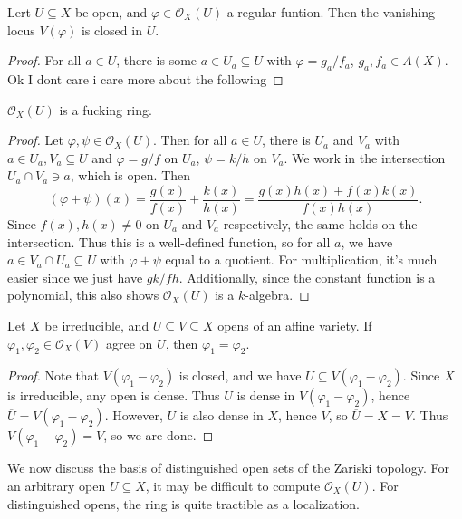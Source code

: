 \begin{lemma}\label{lma:regular-func-zero-loci}
	Lert $U\subseteq X$ be open, and $\varphi \in \mathcal{O}_{X}(U)$ a regular funtion. Then the vanishing locus $V(\varphi )$ is closed in $U$.
\end{lemma}
\begin{proof}
	For all $a\in U$, there is some $a\in U_a \subseteq U$ with $\varphi =g_a/f_a$, $g_a,f_a\in A(X)$. Ok I dont care i care more about the following
\end{proof}
\begin{claim}
	$\mathcal{O}_{X} (U)$ is a fucking ring.
\end{claim}
\begin{proof}
	Let $\varphi ,\psi \in \mathcal{O}_{X} (U)$. Then for all $a\in U$, there is $U_a$ and $V_a$ with $a\in U_a,V_a\subseteq U$ and $\varphi =g/f$ on $U_a$, $\psi =k/h$ on $V_a$. We work in the intersection $U_a \cap V_a\ni a$, which is open. Then
	\[
		(\varphi +\psi )(x) = \frac{g(x)}{f(x)} + \frac{k(x)}{h(x)} = \frac{g(x)h(x) + f(x)k(x)}{f(x)h(x)} 
	.\]
	Since $f(x),h(x) \neq 0$ on $U_a$ and $V_a$ respectively, the same holds on the intersection. Thus this is a well-defined function, so for all $a$, we have $a\in V_a \cap U_a \subseteq U$ with $\varphi +\psi $ equal to a quotient. For multiplication, it's much easier since we just have $gk/fh$. Additionally, since the constant function is a polynomial, this also shows $\mathcal{O}_{X} (U)$ is a $k$-algebra.
\end{proof}
\begin{proposition}\label{prp:identity}
	Let $X$ be irreducible, and $U\subseteq V\subseteq X$ opens of an affine variety. If $\varphi _1,\varphi _2\in \mathcal{O}_{X} (V)$ agree on $U$, then $\varphi _1=\varphi _2$.
\end{proposition}
\begin{proof}
	Note that $V(\varphi _1 - \varphi _2)$ is closed, and we have $U\subseteq V(\varphi _1 - \varphi _2)$. Since $X$ is irreducible, any open is dense. Thus $U$ is dense in $V(\varphi _1 - \varphi _2)$, hence $\overline{U} =V(\varphi _1 - \varphi _2)$. However, $U$ is also dense in $X$, hence $V$, so $\overline{U} =X=V$. Thus $V(\varphi _1 - \varphi _2) = V$, so we are done.
\end{proof}

We now discuss the basis of distinguished open sets of the Zariski topology. For an arbitrary open $U\subseteq X$, it may be difficult to compute $\mathcal{O}_{X} (U)$. For distinguished opens, the ring is quite tractible as a localization.

